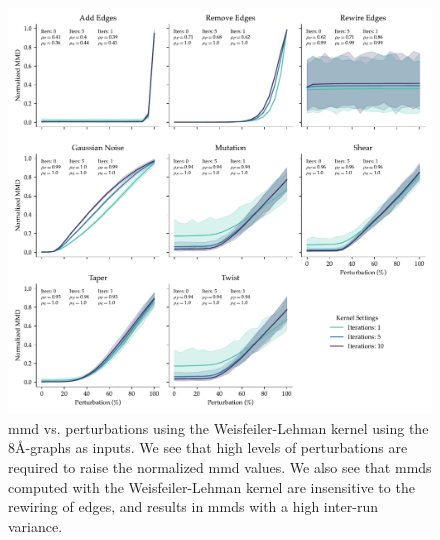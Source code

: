 
\begin{figure}
  \includegraphics[width=\textwidth]{./figures/results/res_3.pdf}
  \caption[Normalized \gls{mmd} values using the Weisfeiler-Lehman kernel subject to
  various perturbations.]{\gls{mmd} vs.
perturbations using the Weisfeiler-Lehman kernel using the
8\si{\angstrom}-graphs as inputs. We see that high levels of perturbations are
required to raise the normalized \gls{mmd} values. We also see that \gls{mmd}s computed with
the Weisfeiler-Lehman kernel are insensitive to the rewiring of edges, and
results in \gls{mmd}s with a high inter-run variance.}
  \label{fig:wlk}
\end{figure}


